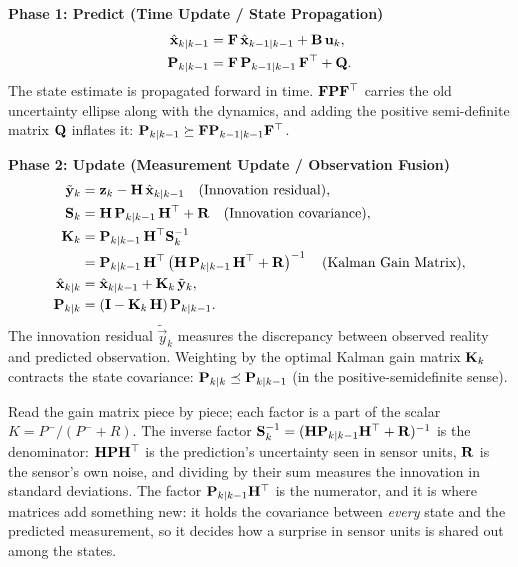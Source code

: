 \begin{formalbox}
\textbf{Phase 1: Predict (Time Update / State Propagation)}
\begin{align}
  \hat{\mathbf{x}}_{k\mid k-1} &= \mathbf{F}\, \hat{\mathbf{x}}_{k-1\mid k-1} + \mathbf{B}\, \mathbf{u}_k , \label{ch36:eq-mat-pred-x} \\
  \mathbf{P}_{k\mid k-1} &= \mathbf{F}\, \mathbf{P}_{k-1\mid k-1}\, \mathbf{F}^\top + \mathbf{Q} . \label{ch36:eq-mat-pred-P}
\end{align}
The state estimate is propagated forward in time. $\mathbf{F}\mathbf{P}\mathbf{F}^\top$ carries the old uncertainty ellipse along with the dynamics, and adding the positive semi-definite matrix $\mathbf{Q}$ inflates it: $\mathbf{P}_{k\mid k-1} \succeq \mathbf{F}\mathbf{P}_{k-1\mid k-1}\mathbf{F}^\top$.

\textbf{Phase 2: Update (Measurement Update / Observation Fusion)}
\begin{align}
  \tilde{\mathbf{y}}_k &= \mathbf{z}_k - \mathbf{H}\, \hat{\mathbf{x}}_{k\mid k-1} \quad \text{(Innovation residual)} , \label{ch36:eq-mat-innov-y} \\
  \mathbf{S}_k &= \mathbf{H}\, \mathbf{P}_{k\mid k-1}\, \mathbf{H}^\top + \mathbf{R} \quad \text{(Innovation covariance)} , \label{ch36:eq-mat-innov-S} \\
  \mathbf{K}_k &= \mathbf{P}_{k\mid k-1}\, \mathbf{H}^\top \mathbf{S}_k^{-1} \notag \\
            &= \mathbf{P}_{k\mid k-1}\, \mathbf{H}^\top \left( \mathbf{H}\, \mathbf{P}_{k\mid k-1}\, \mathbf{H}^\top + \mathbf{R} \right)^{-1} \quad \text{(Kalman Gain Matrix)} , \label{ch36:eq-mat-gain-K} \\
  \hat{\mathbf{x}}_{k\mid k} &= \hat{\mathbf{x}}_{k\mid k-1} + \mathbf{K}_k\, \tilde{\mathbf{y}}_k , \label{ch36:eq-mat-update-x} \\
  \mathbf{P}_{k\mid k} &= \left( \mathbf{I} - \mathbf{K}_k\, \mathbf{H} \right) \mathbf{P}_{k\mid k-1} . \label{ch36:eq-mat-update-P}
\end{align}
The innovation residual $\tilde{\vec{y}}_k$ measures the discrepancy between observed reality and predicted observation. Weighting by the optimal Kalman gain matrix $\mathbf{K}_k$ contracts the state covariance: $\mathbf{P}_{k\mid k} \preceq \mathbf{P}_{k\mid k-1}$ (in the positive-semidefinite sense).
\end{formalbox}

Read the gain matrix piece by piece; each factor is a part of the scalar
$K = P^-/(P^-+R)$. The inverse factor $\mathbf{S}_k^{-1} = (\mathbf{H}\mathbf{P}_{k\mid k-1}\mathbf{H}^\top+\mathbf{R})^{-1}$
is the denominator: $\mathbf{H}\mathbf{P}\mathbf{H}^\top$ is the prediction's uncertainty seen in
sensor units, $\mathbf{R}$ is the sensor's own noise, and dividing by their sum measures the
innovation in standard deviations. The factor $\mathbf{P}_{k\mid k-1}\mathbf{H}^\top$ is the
numerator, and it is where matrices add something new: it holds the covariance between
\emph{every} state and the predicted measurement, so it decides how a surprise in sensor
units is shared out among the states.

